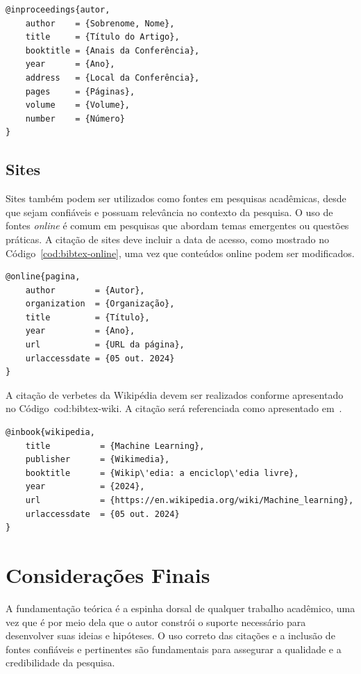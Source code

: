 \begin{codigo}[htb]
\begin{lstlisting}
@inproceedings{autor,
    author    = {Sobrenome, Nome},
    title     = {Título do Artigo},
    booktitle = {Anais da Conferência},
    year      = {Ano},
    address   = {Local da Conferência},
    pages     = {Páginas},
    volume    = {Volume},
    number    = {Número}
}
\end{lstlisting}
\fonteautor
\end{codigo}

\subsection{Sites}

Sites também podem ser utilizados como fontes em pesquisas acadêmicas, desde que sejam confiáveis e possuam relevância no contexto da pesquisa. O uso de fontes \textit{online} é comum em pesquisas que abordam temas emergentes ou questões práticas. A citação de sites deve incluir a data de acesso, como mostrado no Código~\ref{cod:bibtex-online}, uma vez que conteúdos online podem ser modificados.

\begin{codigo}[htb]
\begin{lstlisting}
@online{pagina,
    author        = {Autor},
    organization  = {Organização},
    title         = {Título},
    year          = {Ano},
    url           = {URL da página},
    urlaccessdate = {05 out. 2024}
}
\end{lstlisting}
\fonteautor
\end{codigo}

A citação de verbetes da Wikipédia devem ser realizados conforme apresentado no Código~{cod:bibtex-wiki}. A citação será referenciada como apresentado em~.

\begin{codigo}[htb]
\begin{lstlisting}
@inbook{wikipedia,
    title          = {Machine Learning},
    publisher      = {Wikimedia},
    booktitle      = {Wikip\'edia: a enciclop\'edia livre},
    year           = {2024},
    url            = {https://en.wikipedia.org/wiki/Machine_learning},
    urlaccessdate  = {05 out. 2024}
}
\end{lstlisting}
\fonteautor
\end{codigo}

\section{Considerações Finais}

A fundamentação teórica é a espinha dorsal de qualquer trabalho acadêmico, uma vez que é por meio dela que o autor constrói o suporte necessário para desenvolver suas ideias e hipóteses. O uso correto das citações e a inclusão de fontes confiáveis e pertinentes são fundamentais para assegurar a qualidade e a credibilidade da pesquisa.

